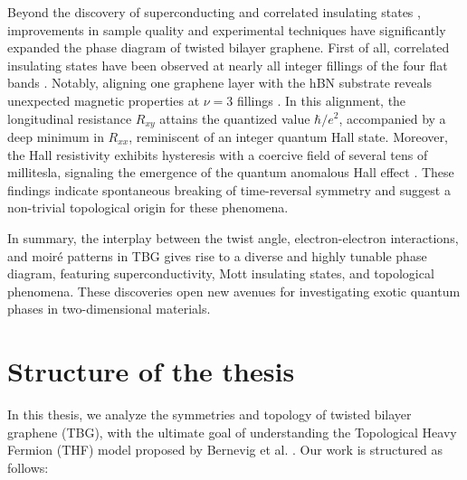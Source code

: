 Beyond the discovery of superconducting \cite{cao2018} and correlated insulating states \cite{cao2018_correlated}, improvements in sample quality and experimental techniques have significantly expanded the phase diagram of twisted bilayer graphene. First of all, correlated insulating states have been observed at nearly all integer fillings of the four flat bands \cite{Lu_2019, Kerelsky_2019, Choi_2019}. Notably, aligning one graphene layer with the hBN substrate reveals unexpected magnetic properties at \(\nu = 3\) fillings \cite{Serlin_2020}. In this alignment, the longitudinal resistance \(R_{xy}\) attains the quantized value \(\hbar/e^2\), accompanied by a deep minimum in \(R_{xx}\), reminiscent of an integer quantum Hall state. Moreover, the Hall resistivity exhibits hysteresis with a coercive field of several tens of millitesla, signaling the emergence of the quantum anomalous Hall effect \cite{thesis_angeli}. These findings indicate spontaneous breaking of time-reversal symmetry and suggest a non-trivial topological origin for these phenomena.

In summary, the interplay between the twist angle, electron-electron interactions, and moiré patterns in TBG gives rise to a diverse and highly tunable phase diagram, featuring superconductivity, Mott insulating states, and topological phenomena. These discoveries open new avenues for investigating exotic quantum phases in two-dimensional materials.

\section{Structure of the thesis} \label{sec:outline_thesis}

In this thesis, we analyze the symmetries and topology of twisted bilayer graphene (TBG), with the ultimate goal of understanding the Topological Heavy Fermion (THF) model proposed by Bernevig et al. \cite{topoheavyfermion2022}. Our work is structured as follows:

